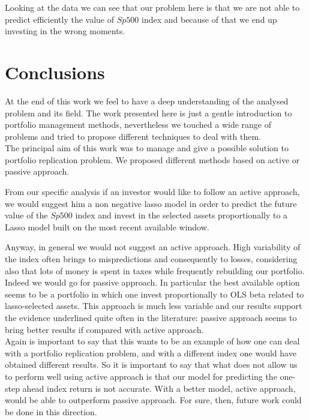\documentclass{article}%
\begin{document}
Looking at the data we can see that our problem here is that we are not able to predict efficiently the value of $Sp500$ index and because of that we end up investing in the wrong moments.


\newpage

\section{Conclusions}

At the end of this work we feel to have a deep understanding of the analysed problem and its field. The work presented here is just a gentle introduction to portfolio management methods, nevertheless we touched a wide range of problems and tried to propose different techniques to deal with them.
\\

The principal aim of this work was to manage and give a possible solution to portfolio replication problem. We  proposed different methods based on active or passive approach.

From our specific analysis if an investor would like to follow an active approach, we would suggest him a non negative lasso model in order to predict the future value of the $Sp500$ index and invest in the selected assets proportionally to a Lasso model built on the most recent available window.

Anyway, in general we would not suggest an active approach. High variability of the index often brings to mispredictions and consequently to losses, considering also that lots of money is spent in taxes while frequently rebuilding our portfolio. Indeed we would go for passive approach. In particular the best available option seems to be a portfolio in which one invest proportionally to OLS beta related to lasso-selected assets.
This approach is much less variable and our results support the evidence underlined quite often in the literature: passive approach seems to bring better results if compared with active approach. 
\\

Again is important to say that this wants to be an example of how one can deal with a portfolio replication problem, and with a different index one would have obtained different results. So it is important to say that what does not allow us to perform well using active approach is that our model for predicting the one-step ahead index return is not accurate. With a better model, active approach, would be able to outperform passive approach. For sure, then, future work could be done in this direction.
\end{document}
